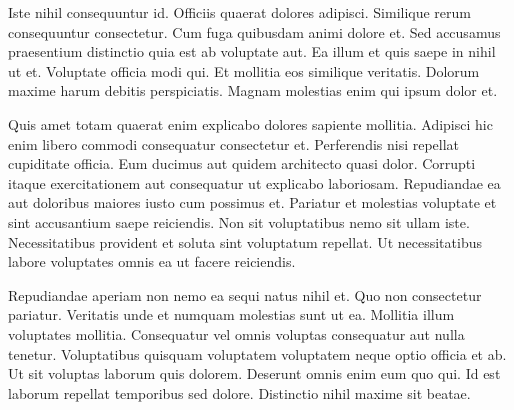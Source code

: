 Iste nihil consequuntur id. Officiis quaerat dolores adipisci. Similique rerum consequuntur consectetur. Cum fuga quibusdam animi dolore et. Sed accusamus praesentium distinctio quia est ab voluptate aut. Ea illum et quis saepe in nihil ut et. Voluptate officia modi qui. Et mollitia eos similique veritatis. Dolorum maxime harum debitis perspiciatis. Magnam molestias enim qui ipsum dolor et.

Quis amet totam quaerat enim explicabo dolores sapiente mollitia. Adipisci hic enim libero commodi consequatur consectetur et. Perferendis nisi repellat cupiditate officia. Eum ducimus aut quidem architecto quasi dolor. Corrupti itaque exercitationem aut consequatur ut explicabo laboriosam. Repudiandae ea aut doloribus maiores iusto cum possimus et. Pariatur et molestias voluptate et sint accusantium saepe reiciendis. Non sit voluptatibus nemo sit ullam iste. Necessitatibus provident et soluta sint voluptatum repellat. Ut necessitatibus labore voluptates omnis ea ut facere reiciendis.

Repudiandae aperiam non nemo ea sequi natus nihil et. Quo non consectetur pariatur. Veritatis unde et numquam molestias sunt ut ea. Mollitia illum voluptates mollitia. Consequatur vel omnis voluptas consequatur aut nulla tenetur. Voluptatibus quisquam voluptatem voluptatem neque optio officia et ab. Ut sit voluptas laborum quis dolorem. Deserunt omnis enim eum quo qui. Id est laborum repellat temporibus sed dolore. Distinctio nihil maxime sit beatae.
